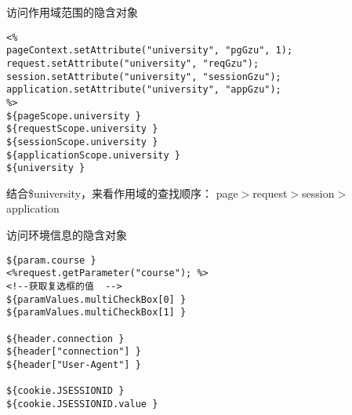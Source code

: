 \documentclass{beamer}
\begin{document}
\begin{frame}[fragile]{访问作用域范围的隐含对象}
\begin{block}{}
\begin{lstlisting}
<%
pageContext.setAttribute("university", "pgGzu", 1);
request.setAttribute("university", "reqGzu");
session.setAttribute("university", "sessionGzu");
application.setAttribute("university", "appGzu");
%>
${pageScope.university }
${requestScope.university }
${sessionScope.university }
${applicationScope.university }
${university }
\end{lstlisting}
\end{block}
结合\${university}，来看作用域的查找顺序：
page$>$request$>$session$>$application
\end{frame}

\begin{frame}[fragile]{访问环境信息的隐含对象}
\begin{block}{}
\begin{lstlisting}
${param.course }
<%request.getParameter("course"); %>
<!--获取复选框的值  -->
${paramValues.multiCheckBox[0] }
${paramValues.multiCheckBox[1] }

${header.connection }
${header["connection"] }
${header["User-Agent"] }

${cookie.JSESSIONID }
${cookie.JSESSIONID.value }
\end{lstlisting}
\end{block}
\end{frame}
\end{document}
